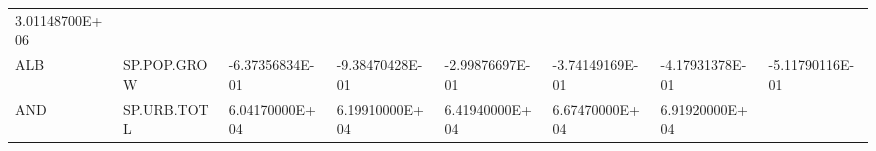 \documentclass[]{article}
\begin{document}
\begin{longtable}[]{@{}llllllll@{}}
\begin{minipage}[t]{0.11\columnwidth}
3.01148700E+06\strut
\end{minipage}\tabularnewline
\begin{minipage}[t]{0.06\columnwidth}\raggedright
ALB\strut
\end{minipage} & \begin{minipage}[t]{0.08\columnwidth}\raggedright
SP.POP.GROW\strut
\end{minipage} & \begin{minipage}[t]{0.11\columnwidth}\raggedright
-6.37356834E-01\strut
\end{minipage} & \begin{minipage}[t]{0.11\columnwidth}\raggedright
-9.38470428E-01\strut
\end{minipage} & \begin{minipage}[t]{0.11\columnwidth}\raggedright
-2.99876697E-01\strut
\end{minipage} & \begin{minipage}[t]{0.11\columnwidth}\raggedright
-3.74149169E-01\strut
\end{minipage} & \begin{minipage}[t]{0.11\columnwidth}\raggedright
-4.17931378E-01\strut
\end{minipage} & \begin{minipage}[t]{0.11\columnwidth}\raggedright
-5.11790116E-01\strut
\end{minipage}\tabularnewline
\begin{minipage}[t]{0.06\columnwidth}\raggedright
AND\strut
\end{minipage} & \begin{minipage}[t]{0.08\columnwidth}\raggedright
SP.URB.TOTL\strut
\end{minipage} & \begin{minipage}[t]{0.11\columnwidth}\raggedright
6.04170000E+04\strut
\end{minipage} & \begin{minipage}[t]{0.11\columnwidth}\raggedright
6.19910000E+04\strut
\end{minipage} & \begin{minipage}[t]{0.11\columnwidth}\raggedright
6.41940000E+04\strut
\end{minipage} & \begin{minipage}[t]{0.11\columnwidth}\raggedright
6.67470000E+04\strut
\end{minipage} & \begin{minipage}[t]{0.11\columnwidth}\raggedright
6.91920000E+04\strut
\end{minipage} & \begin{minipage}[t]{0.11\columnwidth}\raggedright

\end{minipage}
\end{longtable}
\end{document}
